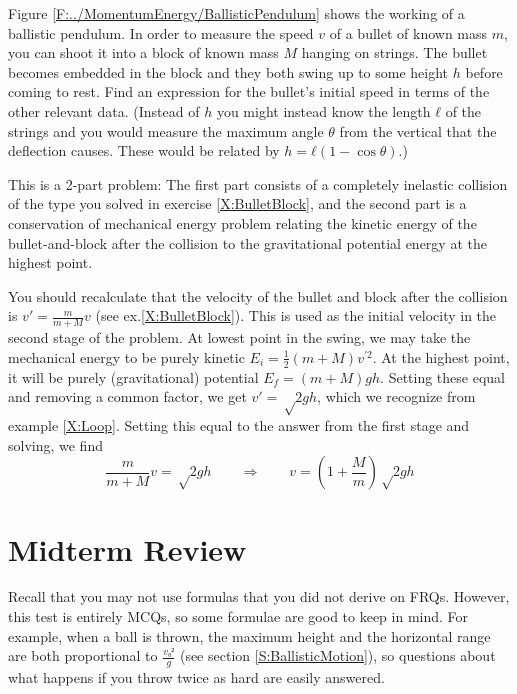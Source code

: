 \begin{example}
Figure \ref{F:../MomentumEnergy/BallisticPendulum} shows the working of a ballistic pendulum. In order to measure the speed $v$ of a bullet of known mass $m$, you can shoot it into a block of known mass $M$ hanging on strings. The bullet becomes embedded in the block and they both swing up to some height $h$ before coming to rest. Find an expression for the bullet's initial speed in terms of the other relevant data.
(Instead of $h$ you might instead know the length $ℓ$ of the strings and you would measure the maximum angle $θ$ from the vertical that the deflection causes. These would be related by $h = ℓ (1-\cos θ)$.) 
\begin{solution}
This is a 2-part problem: The first part consists of a completely inelastic collision of the type you solved in exercise \ref{X:BulletBlock}, and the second part is a conservation of mechanical energy problem relating the kinetic energy of the bullet-and-block after the collision to the gravitational potential energy at the highest point. 

You should recalculate that the velocity of the bullet and block after the collision is $v'= \frac m{m+M} v$ (see ex.\ref{X:BulletBlock}). This is used as the initial velocity in the second stage of the problem. At lowest point in the swing, we may take the mechanical energy to be purely kinetic $E_i = \frac12 (m+M) v^{'2}$. At the highest point, it will be purely (gravitational) potential $E_f = (m+M)gh$. Setting these equal and removing a common factor, we get $v' = √{2gh}$, which we recognize from example \ref{X:Loop}. Setting this equal to the answer from the first stage and solving, we find
$$
\frac m{m+M} v = √{2gh}
\quad \quad ⇒ \quad \quad
v =\left( {1+\frac Mm}\right) √{2gh} 
$$
\end{solution}
\end{example}


\section{Midterm Review}


Recall that you may not use formulas that you did not derive on FRQs. However, this test is entirely MCQs, so some formulae are good to keep in mind. For example, when a ball is thrown, the maximum height and the horizontal range are both proportional to $\frac{v₀²}g$ (see section \ref{S:BallisticMotion}), so questions about what happens if you throw twice as hard are easily answered. 

